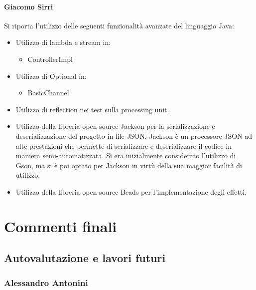 \documentclass[a4paper,12pt]{report}
\begin{document}
\subsubsection{Giacomo Sirri}
Si riporta l’utilizzo delle seguenti funzionalità avanzate del linguaggio Java:
\begin{itemize}
    \item Utilizzo di lambda e stream in:
    \begin{itemize}
        \item ControllerImpl
    \end{itemize}
    \item Utilizzo di Optional in:
    \begin{itemize}
        \item BasicChannel
    \end{itemize}
    \item Utilizzo di reflection nei test sulla processing unit.
    \item Utilizzo della libreria open-source Jackson per la serializzazione e deserializzazione del progetto in file JSON. Jackson è un processore JSON ad alte prestazioni che permette di serializzare e deserializzare il codice in maniera semi-automatizzata. Si era inizialmente considerato l’utilizzo di Gson, ma si è poi optato per Jackson in virtù della sua maggior facilità di utilizzo.
    \item Utilizzo della libreria open-source Beads per l’implementazione degli effetti.
\end{itemize}
\endsubsubsection
\endsubsection
\endsection

\chapter{Commenti finali}
\section{Autovalutazione e lavori futuri}
\subsection{Alessandro Antonini}
\endsubsection
\end{document}
